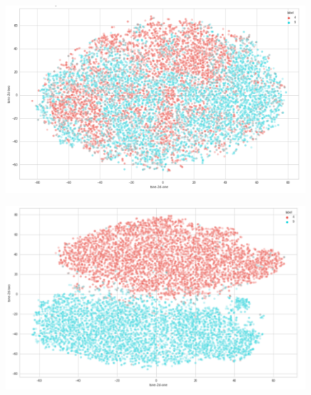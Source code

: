 \documentclass[runningheads]{llncs}
\begin{document}
\begin{figure}
\centering
\begin{minipage}{.5\textwidth}
  \centering
  \includegraphics[width=.9\linewidth]{tsne_4_9_unsup.png}
  \label{tsne_un_4_9}
\end{minipage}%
\begin{minipage}{.5\textwidth}
  \centering
  \includegraphics[width=.9\linewidth]{tsne_4_9_semi.png}
  \label{tsne_semi_4_9}
\end{minipage}
\end{figure}
\end{document}
